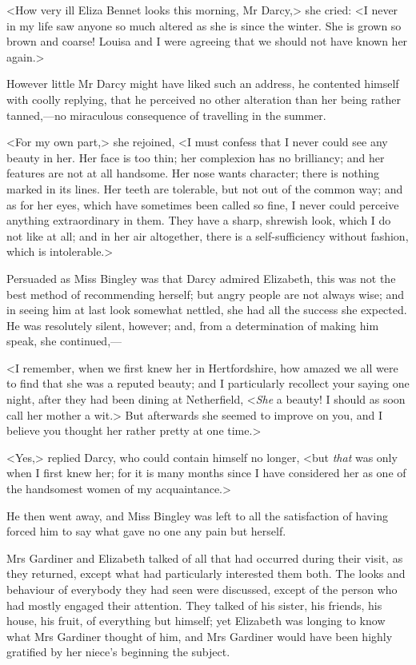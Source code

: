 <How very ill Eliza Bennet looks this morning, Mr Darcy,> she cried: <I never in my life saw anyone so much altered as she is since the winter. She is grown so brown and coarse! Louisa and I were agreeing that we should not have known her again.>

However little Mr Darcy might have liked such an address, he contented himself with coolly replying, that he perceived no other alteration than her being rather tanned,—no miraculous consequence of travelling in the summer.

<For my own part,> she rejoined, <I must confess that I never could see any beauty in her. Her face is too thin; her complexion has no brilliancy; and her features are not at all handsome. Her nose wants character; there is nothing marked in its lines. Her teeth are tolerable, but not out of the common way; and as for her eyes, which have sometimes been called so fine, I never could perceive anything extraordinary in them. They have a sharp, shrewish look, which I do not like at all; and in her air altogether, there is a self-sufficiency without fashion, which is intolerable.>

Persuaded as Miss Bingley was that Darcy admired Elizabeth, this was not the best method of recommending herself; but angry people are not always wise; and in seeing him at last look somewhat nettled, she had all the success she expected. He was resolutely silent, however; and, from a determination of making him speak, she continued,—

<I remember, when we first knew her in Hertfordshire, how amazed we all were to find that she was a reputed beauty; and I particularly recollect your saying one night, after they had been dining at Netherfield, <\textit{She} a beauty! I should as soon call her mother a wit.> But afterwards she seemed to improve on you, and I believe you thought her rather pretty at one time.>

<Yes,> replied Darcy, who could contain himself no longer, <but \textit{that} was only when I first knew her; for it is many months since I have considered her as one of the handsomest women of my acquaintance.>

He then went away, and Miss Bingley was left to all the satisfaction of having forced him to say what gave no one any pain but herself.

Mrs Gardiner and Elizabeth talked of all that had occurred during their visit, as they returned, except what had particularly interested them both. The looks and behaviour of everybody they had seen were discussed, except of the person who had mostly engaged their attention. They talked of his sister, his friends, his house, his fruit, of everything but himself; yet Elizabeth was longing to know what Mrs Gardiner thought of him, and Mrs Gardiner would have been highly gratified by her niece's beginning the subject.
